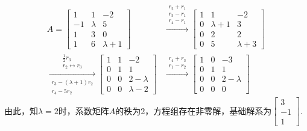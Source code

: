 \documentclass[a4paper]{book}
\begin{document}
\begin{align*}
A= \begin{bmatrix}1&1&-2\\-1&\lambda&5\\1&3&0\\1&6&\lambda+1\end{bmatrix} &
   \xrightarrow{\begin{matrix}r_2+r_1\\r_3-r_1\\r_4-r_1\end{matrix}}
   \begin{bmatrix}1&1&-2\\0&\lambda+1&3\\0&2&2\\0&5&\lambda+3\end{bmatrix} \\
   \xrightarrow[\begin{matrix}r_3-(\lambda+1)r_2\\r_4-5r_2\end{matrix}]
   {\begin{matrix}\frac{1}{2}r_3\\r_2\leftrightarrow r_3\end{matrix}}
   \begin{bmatrix}1&1&-2\\0&1&1\\0&0&2-\lambda\\0&0&\lambda-2\end{bmatrix} &
   \xrightarrow{\begin{matrix}r_4+r_3\\r_1-r_2\end{matrix}}
   \begin{bmatrix}1&0&-3\\0&1&1\\0&0&2-\lambda\\0&0&0\end{bmatrix}
\end{align*}
由此，知$\lambda=2$时，系数矩阵$A$的秩为2，方程组存在非零解，基础解系为$\begin{bmatrix}3\\-1\\1\end{bmatrix}$.\\
\end{document}
